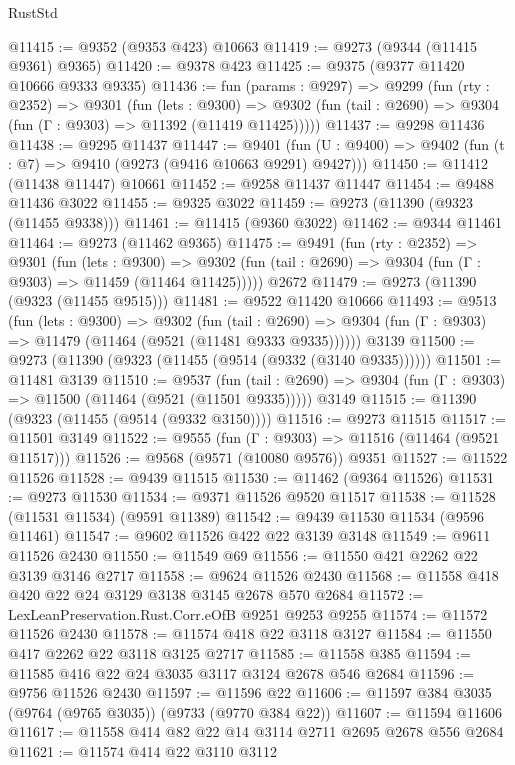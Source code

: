 \begin{lexlean}{RustStd}
\begin{coremodule}
{\begin{coremodule}
{{{{{{{{{{{{{{{{{{{{{{{{{{{{{{{{{{{{{{{{{{{{{{{{{{{{{{{@11415 := @9352 (@9353 @423) @10663
@11419 := @9273 (@9344 (@11415 @9361) @9365)
@11420 := @9378 @423
@11425 := @9375 (@9377 @11420 @10666 @9333 @9335)
@11436 := fun (params : @9297) =>
  @9299
    (fun (rty : @2352) =>
    @9301
      (fun (lets : @9300) =>
      @9302 (fun (tail : @2690) => @9304 (fun (Γ : @9303) => @11392 (@11419 @11425)))))
@11437 := @9298 @11436
@11438 := @9295 @11437
@11447 := @9401
    (fun (U : @9400) => @9402 (fun (t : @7) => @9410 (@9273 (@9416 @10663 @9291) @9427)))
@11450 := @11412 (@11438 @11447) @10661
@11452 := @9258 @11437 @11447
@11454 := @9488 @11436 @3022
@11455 := @9325 @3022
@11459 := @9273 (@11390 (@9323 (@11455 @9338)))
@11461 := @11415 (@9360 @3022)
@11462 := @9344 @11461
@11464 := @9273 (@11462 @9365)
@11475 := @9491
    (fun (rty : @2352) =>
    @9301
      (fun (lets : @9300) =>
      @9302 (fun (tail : @2690) => @9304 (fun (Γ : @9303) => @11459 (@11464 @11425)))))
    @2672
@11479 := @9273 (@11390 (@9323 (@11455 @9515)))
@11481 := @9522 @11420 @10666
@11493 := @9513
    (fun (lets : @9300) =>
    @9302
      (fun (tail : @2690) =>
      @9304 (fun (Γ : @9303) => @11479 (@11464 (@9521 (@11481 @9333 @9335))))))
    @3139
@11500 := @9273 (@11390 (@9323 (@11455 (@9514 (@9332 (@3140 @9335))))))
@11501 := @11481 @3139
@11510 := @9537
    (fun (tail : @2690) => @9304 (fun (Γ : @9303) => @11500 (@11464 (@9521 (@11501 @9335)))))
    @3149
@11515 := @11390 (@9323 (@11455 (@9514 (@9332 @3150))))
@11516 := @9273 @11515
@11517 := @11501 @3149
@11522 := @9555 (fun (Γ : @9303) => @11516 (@11464 (@9521 @11517)))
@11526 := @9568 (@9571 (@10080 @9576)) @9351
@11527 := @11522 @11526
@11528 := @9439 @11515
@11530 := @11462 (@9364 @11526)
@11531 := @9273 @11530
@11534 := @9371 @11526 @9520 @11517
@11538 := @11528 (@11531 @11534) (@9591 @11389)
@11542 := @9439 @11530 @11534 (@9596 @11461)
@11547 := @9602 @11526 @422 @22 @3139 @3148
@11549 := @9611 @11526 @2430
@11550 := @11549 @69
@11556 := @11550 @421 @2262 @22 @3139 @3146 @2717
@11558 := @9624 @11526 @2430
@11568 := @11558 @418 @420 @22 @24 @3129 @3138 @3145 @2678 @570 @2684
@11572 := LexLeanPreservation.Rust.Corr.eOfB @9251 @9253 @9255
@11574 := @11572 @11526 @2430
@11578 := @11574 @418 @22 @3118 @3127
@11584 := @11550 @417 @2262 @22 @3118 @3125 @2717
@11585 := @11558 @385
@11594 := @11585 @416 @22 @24 @3035 @3117 @3124 @2678 @546 @2684
@11596 := @9756 @11526 @2430
@11597 := @11596 @22
@11606 := @11597 @384 @3035 (@9764 (@9765 @3035)) (@9733 (@9770 @384 @22))
@11607 := @11594 @11606
@11617 := @11558 @414 @82 @22 @14 @3114 @2711 @2695 @2678 @556 @2684
@11621 := @11574 @414 @22 @3110 @3112
}}}}}}}}}}}}}}}}}}}}}}}}}}}}}}}}}}}}}}}}}}}}}}}}}}}}}}}
\end{coremodule}}
\end{coremodule}
\end{lexlean}
